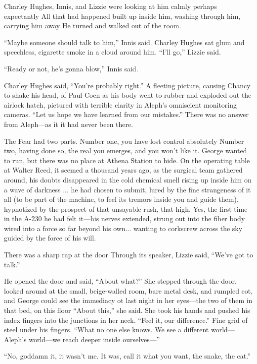 Charley Hughes, Innis, and Lizzie were looking at him calmly perhaps expectantly All that had happened built up inside him, washing through him, carrying him away He turned and walked out of the room.

``Maybe someone should talk to him,'' Innis said. Charley Hughes sat glum and speechless, cigarette smoke in a cloud around him. ``I'll go,'' Lizzie said.

``Ready or not, he's gonna blow,'' Innis said.

Charley Hughes said, ``You're probably right.'' A fleeting picture, causing Chancy to shake his head, of Paul Coen as his body went to rubber and exploded out the airlock hatch, pictured with terrible clarity in Aleph's omniscient monitoring cameras. ``Let us hope we have learned from our mistakes.''
There was no answer from Aleph—as it it had never been there.

The Fear had two parts. Number one, you have lost control absolutely Number two, having done so, the real you emerges, and you won't like it. George wanted to run, but there was no place at Athena Station to hide. On the operating table at Walter Reed, it seemed a thousand years ago, as the surgical team gathered around, his doubts disappeared in the cold chemical smell rising up inside him on a wave of darkness ... he had chosen to submit, lured by the fine strangeness of it all (to be part of the machine, to feel its tremors inside you and guide them), hypnotized by the prospect of that unsayable rush, that high. Yes, the first time in the A-230 he had felt it—his nerves extended, strung out into the fiber body wired into a force so far beyond his own... wanting to corkscrew across the sky guided by the force of his will.

There was a sharp rap at the door Through its speaker, Lizzie said, ``We've got to talk.''

He opened the door and said, ``About what?'' She stepped through the door, looked around at the small, beige-walled room, bare metal desk, and rumpled cot, and George could see the immediacy ot last night in her eyes—the two of them in that bed, on this floor ``About this,'' she said. She took his hands and pushed his index fingers into the junctions in her neck. ``Feel it, our difference.'' Fine grid of steel under his fingers. ``What no one else knows. We see a different world—Aleph's world—we reach deeper inside ourselves—''

``No, goddamn it, it wasn't me. It was, call it what you want, the snake, the cat.''

